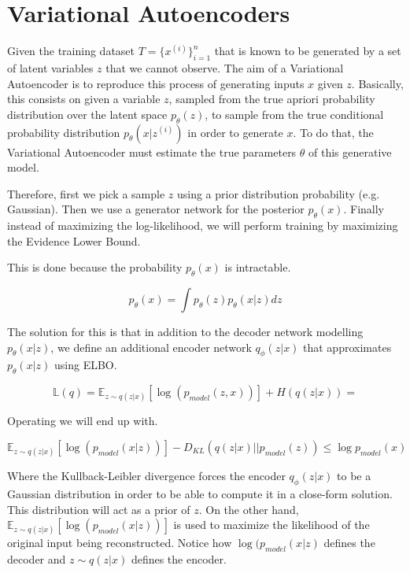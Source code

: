 \section{Variational Autoencoders}

Given the training dataset $T = \{ x^{(i)} \}_{i=1}^n$ that is known to be generated by a set of latent variables $z$ that we cannot observe. The aim of a Variational Autoencoder is to reproduce this process of generating inputs $x$ given $z$. Basically, this consists on given a variable $z$, sampled from the true apriori probability distribution over the latent space $p_{\theta}(z)$, to sample from the true conditional probability distribution $p_{\theta} (x | z^{(i)})$ in order to generate $x$. To do that, the Variational Autoencoder must estimate the true parameters $\theta$ of this generative model.

\noindent Therefore, first we pick a sample $z$ using a prior distribution probability (e.g. Gaussian). Then we use a generator network for the posterior $p_{\theta} (x)$. Finally instead of maximizing the log-likelihood, we will perform training by maximizing the Evidence Lower Bound.

\noindent This is done because the probability $p_{\theta} (x)$ is intractable.

$$ p_{\theta} (x) = \int p_{\theta}(z) p_{\theta} (x | z) dz $$

\noindent The solution for this is that in addition to the decoder network modelling $p_{\theta}(x|z)$, we define an additional encoder network $q_{\phi} (z | x)$ that approximates $p_{\theta}(x|z)$ using ELBO.

$$ \mathbb{L}(q) = \mathbb{E}_{z \sim q(z \vert x)} \left[ \log (p_{model} (z, x )  ) \right] + H(q(z | x)) = $$  

\noindent Operating we will end up with.

$$ \mathbb{E}_{z \sim q(z \vert x)} \left[ \log (p_{model} (x \vert z)  ) \right] - D_{KL} \left( q( z \vert x) || p_{model} (z)    \right) \leq \log p_{model} (x) $$

Where the Kullback-Leibler divergence forces the encoder $q_{\phi} (z | x)$ to be a Gaussian distribution in order to be able to compute it in a close-form solution. This distribution will act as a prior of $z$. On the other hand, $\mathbb{E}_{z \sim q(z \vert x)} \left[ \log (p_{model} (x \vert z)  ) \right] $ is used to maximize the likelihood of the original input being reconstructed. Notice how $\log (p_{model} (x \vert z) $ defines the decoder and $z \sim q(z \vert x)$ defines the encoder.

